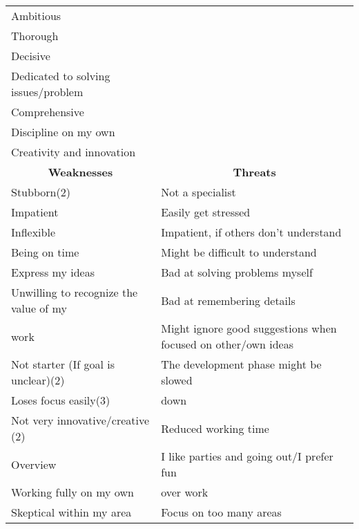 \begin{table}[h]
\begin{tabular}{|p{}|p{}|}
Ambitious                               &\\
Thorough                                &\\
Decisive                                &\\
Dedicated to solving issues/problem     &\\
Comprehensive                           &\\
Discipline on my own                    &\\ %
Creativity and innovation               &\\
 \hline
\multicolumn{1}{|c|}{\textbf {Weaknesses}}                                                  & \multicolumn{1}{c|}{\textbf{Threats}}                          \\ \hline
Stubborn(2)                             & Not a specialist\\
Impatient                               & Easily get stressed\\
Inflexible                              & Impatient, if others don't understand\\ %
Being on time                           & Might be difficult to understand\\
Express my ideas                        & Bad at solving problems myself\\
Unwilling to recognize the value of my  & Bad at remembering details\\ %
work                                    & Might ignore good suggestions when focused on other/own ideas\\
Not starter (If goal is unclear)(2)     & The development phase might be slowed \\
Loses focus easily(3)                   & down\\ %
Not very innovative/creative (2)        & Reduced working time \\
Overview                                & I like parties and going out/I prefer fun \\
Working fully on my own                 & over work\\ %
Skeptical within my area                & Focus on too many areas\\

\end{tabular}
\end{table}
